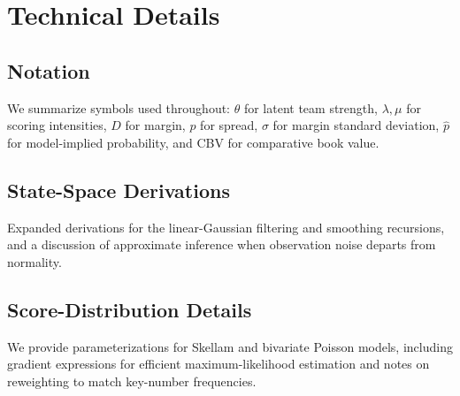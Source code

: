 %

\chapter{Technical Details}\label{app:technical-details}


\section{Notation}\label{app:notation-summary}
We summarize symbols used throughout: $\theta$ for latent team strength, $\lambda,\mu$ for scoring intensities, $D$ for margin, $p$ for spread, $\sigma$ for margin standard deviation, $\hat p$ for model-implied probability, and CBV for comparative book value.

\section{State-Space Derivations}\label{app:state-space}
Expanded derivations for the linear-Gaussian filtering and smoothing recursions, and a discussion of approximate inference when observation noise departs from normality.

\section{Score-Distribution Details}\label{app:score-dist}
We provide parameterizations for Skellam and bivariate Poisson models, including gradient expressions for efficient maximum-likelihood estimation and notes on reweighting to match key-number frequencies.

